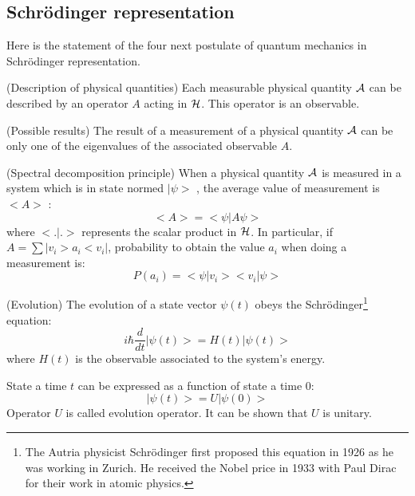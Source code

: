 \documentclass[12pt]{book}
\begin{document}
\subsection{Schr\"odinger representation}
Here is the statement of the four next postulate of quantum mechanics in
Schr\"odinger representation.
\begin{postulat}
(Description of physical quantities) Each measurable physical quantity $\cal
A$ can be described by an operator $A$ acting in $\cal H$. This operator is an
observable.
\end{postulat}
\begin{postulat}
(Possible results)
The result of a measurement of a physical quantity $\cal A$ can be only one of
the eigenvalues of the associated observable $A$.
\end{postulat}
\begin{postulat}(Spectral decomposition principle)
When a physical quantity $\cal A$ is measured in a system which is in state
normed $|\psi \mathrel{>} $ , the average value of measurement is $<A>$ :
\begin{equation}
<A>=<\psi|A\psi>
\end{equation}
where $< . | . >$ represents the scalar product in $\cal H$.
In particular, if $A=\sum |v_i>a_i<v_i|$, probability to obtain the value
$a_i$ when doing a measurement is:
\begin{equation}
P(a_i)=<\psi|v_i><v_i|\psi>
\end{equation}
\end{postulat}
\begin{postulat}
(Evolution)
The evolution of a state vector $\psi(t)$ obeys the
Schr\"odinger\footnote{The Autria physicist Schr\"odinger first
proposed this equation in 1926 as he was working in Zurich. He
received the Nobel price in 1933 with Paul Dirac for their work in
atomic physics.} equation:
\begin{equation}
i\hbar \frac{d}{dt} |\psi(t)\mathrel{>} =H(t)|\psi(t)\mathrel{>} 
\end{equation}
where $H(t)$ is the observable associated to the system's energy.
\end{postulat}
\begin{rem}
State a time $t$ can be expressed as a function of state a time $0$:
\begin{equation}
|\psi(t)\mathrel{>}=U|\psi(0)\mathrel{>}
\end{equation}
Operator $U$ is called evolution 
operator. 
It can be shown that $U$ is unitary.
\end{rem}
\end{document}
